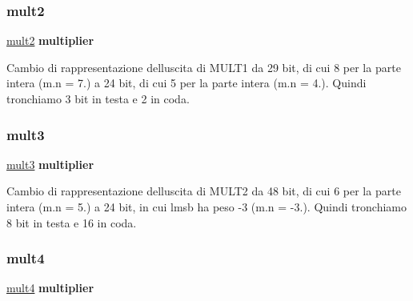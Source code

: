 \subsubsection{\texorpdfstring{mult2}{mult2}}
{\footnotesize\ttfamily \hyperlink{class_linear_regression_1_1_structural_a7c5c7b6fb03b66e49b0eb767162f01a8}{mult2} {\bfseries \textcolor{vhdlchar}{multiplier}\textcolor{vhdlchar}{ }} \hspace{0.3cm}{\ttfamily [Instantiation]}}

Cambio di rappresentazione dell\textquotesingle{}uscita di M\+U\+L\+T1 da 29 bit, di cui 8 per la parte intera (m.\+n = 7.) a 24 bit, di cui 5 per la parte intera (m.\+n = 4.). Quindi tronchiamo 3 bit in testa e 2 in coda. \mbox{\label{class_linear_regression_1_1_structural_adf80c8ef67f9eb716830cfb9a6d3a980}} 
\subsubsection{\texorpdfstring{mult3}{mult3}}
{\footnotesize\ttfamily \hyperlink{class_linear_regression_1_1_structural_adf80c8ef67f9eb716830cfb9a6d3a980}{mult3} {\bfseries \textcolor{vhdlchar}{multiplier}\textcolor{vhdlchar}{ }} \hspace{0.3cm}{\ttfamily [Instantiation]}}

Cambio di rappresentazione dell\textquotesingle{}uscita di M\+U\+L\+T2 da 48 bit, di cui 6 per la parte intera (m.\+n = 5.) a 24 bit, in cui l\textquotesingle{}msb ha peso -\/3 (m.\+n = -\/3.). Quindi tronchiamo 8 bit in testa e 16 in coda. \mbox{\label{class_linear_regression_1_1_structural_a65ae62ab3b1e6675bf4e4bcf572d2025}} 
\subsubsection{\texorpdfstring{mult4}{mult4}}
{\footnotesize\ttfamily \hyperlink{class_linear_regression_1_1_structural_a65ae62ab3b1e6675bf4e4bcf572d2025}{mult4} {\bfseries \textcolor{vhdlchar}{multiplier}\textcolor{vhdlchar}{ }} \hspace{0.3cm}{\ttfamily [Instantiation]}}

